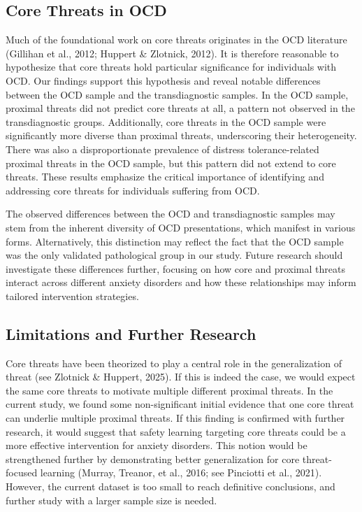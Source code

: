 \documentclass[
  man,floatsintext]{apa7}
\begin{document}
\subsection{Core Threats in OCD}\label{core-threats-in-ocd}

Much of the foundational work on core threats originates in the OCD literature (Gillihan et al., 2012; Huppert \& Zlotnick, 2012).
It is therefore reasonable to hypothesize that core threats hold particular significance for individuals with OCD.
Our findings support this hypothesis and reveal notable differences between the OCD sample and the transdiagnostic samples.
In the OCD sample, proximal threats did not predict core threats at all, a pattern not observed in the transdiagnostic groups.
Additionally, core threats in the OCD sample were significantly more diverse than proximal threats, underscoring their heterogeneity.
There was also a disproportionate prevalence of distress tolerance-related proximal threats in the OCD sample, but this pattern did not extend to core threats.
These results emphasize the critical importance of identifying and addressing core threats for individuals suffering from OCD.

The observed differences between the OCD and transdiagnostic samples may stem from the inherent diversity of OCD presentations, which manifest in various forms.
Alternatively, this distinction may reflect the fact that the OCD sample was the only validated pathological group in our study.
Future research should investigate these differences further, focusing on how core and proximal threats interact across different anxiety disorders and how these relationships may inform tailored intervention strategies.

\subsection{Limitations and Further Research}\label{limitations-and-further-research}

Core threats have been theorized to play a central role in the generalization of threat (see Zlotnick \& Huppert, 2025).
If this is indeed the case, we would expect the same core threats to motivate multiple different proximal threats.
In the current study, we found some non-significant initial evidence that one core threat can underlie multiple proximal threats.
If this finding is confirmed with further research, it would suggest that safety learning targeting core threats could be a more effective intervention for anxiety disorders.
This notion would be strengthened further by demonstrating better generalization for core threat-focused learning (Murray, Treanor, et al., 2016; see Pinciotti et al., 2021).
However, the current dataset is too small to reach definitive conclusions, and further study with a larger sample size is needed.
\end{document}
